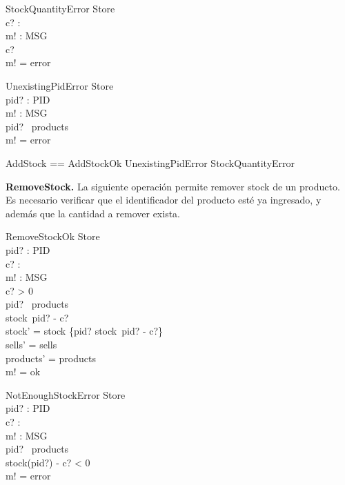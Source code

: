 \documentclass[fleqn,colorlinks,linkcolor=blue,citecolor=blue,urlcolor=blue]{article}
\begin{document}
\begin{schema}{StockQuantityError}
\Xi Store \\
c? : \nat \\
m! : MSG \\
\where
c?  \\
m! = error
\end{schema}

\begin{schema}{UnexistingPidError}
\Xi Store \\
pid? : PID \\
m! : MSG \\
\where
pid? \notin \dom~products \\
m! = error
\end{schema}

\begin{zed} 
AddStock == AddStockOk \lor UnexistingPidError \lor StockQuantityError
\end{zed}

\noindent
\textbf{RemoveStock.}  La siguiente operación permite remover stock de un producto. Es necesario verificar que el identificador del producto esté ya ingresado, y además que la cantidad a remover exista.

\begin{schema}{RemoveStockOk}
\Delta Store \\
pid? : PID \\
c? : \nat \\
m! : MSG \\
\where
c? > 0 \\
pid? \in \dom~products \\
stock~pid? - c?   \\
stock' = stock \oplus \{pid? \mapsto stock~pid? - c?\} \\
sells' = sells \\
products' = products \\
m! = ok
\end{schema}

\begin{schema}{NotEnoughStockError}
\Xi Store \\
pid? : PID \\
c? : \nat \\
m! : MSG \\
\where
pid? \in \dom~products \\
stock(pid?) - c? < 0 \\
m! = error
\end{schema}
\end{document}
